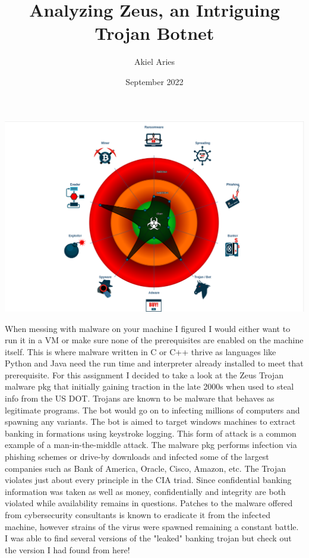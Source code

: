 \documentclass[12pt, letterpaper]{article}
\title{Analyzing Zeus, an Intriguing Trojan Botnet}
\author{Akiel Aries}
\date{September 2022}
\begin{document}
\maketitle
\begin{sloppypar}

\includegraphics[scale=0.3]{ZEUS_CLASSIFICATION.png}


When messing with malware on your machine I figured I would either want 
to run it in a VM or make sure none of the prerequisites are enabled on
the machine itself. This is where malware written in C or C++ thrive as
languages like Python and Java need the run time and interpreter already
installed to meet that prerequisite. For this assignment I decided to
take a look at the Zeus Trojan malware pkg that initially gaining
traction in the late 2000s when used to steal info from the US DOT.
Trojans are known to be malware that behaves as legitimate programs. The
bot would go on to infecting millions of computers and spawning any
variants. The bot is aimed to target windows machines to extract banking
in formations using keystroke logging. This form of attack is a common
example of a man-in-the-middle attack. The malware pkg performs
infection via phishing schemes or drive-by downloads and infected some
of the largest companies such as Bank of America, Oracle, Cisco, Amazon,
etc. The Trojan violates just about every principle in the CIA triad.
Since confidential banking information was taken as well as money,
confidentially and integrity are both violated while availability
remains in questions. Patches to the malware offered from cybersecurity
consultants is known to eradicate it from the infected machine, however
strains of the virus were spawned remaining a constant battle.
I was able to find several versions of the "leaked" banking trojan but
check out the version I had found from here!


\end{sloppypar}
\end{document}
